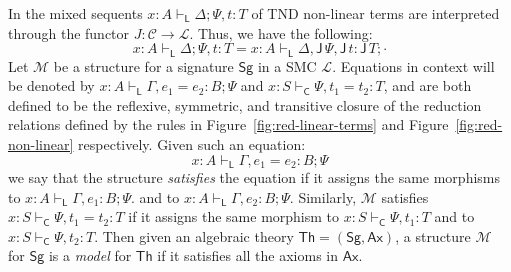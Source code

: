 \documentclass{lmcs}
\newcommand{\DualLNLLogicnt}[1]{\mathit{#1}}
\newcommand{\DualLNLLogicmv}[1]{\mathit{#1}}
\newcommand{\DualLNLLogicsym}[1]{#1}
\begin{document}
In the mixed sequents $x:A \vdash_{\mathsf{L}} \Delta ; \Psi, t:T$ of TND non-linear terms are interpreted through the functor $J :
\mathcal{C} \rightarrow \mathcal{L}$. Thus, we have the following:
\[
   \DualLNLLogicmv{x}  :  \DualLNLLogicnt{A}  \vdash_{\mathsf{L} }  \Delta ; \Psi  \DualLNLLogicsym{,}  \DualLNLLogicnt{t}  \DualLNLLogicsym{:}  \DualLNLLogicnt{T}   =  \DualLNLLogicmv{x}  :  \DualLNLLogicnt{A}  \vdash_{\mathsf{L} }  \Delta  \DualLNLLogicsym{,}    \mathsf{J}\, \Psi    \DualLNLLogicsym{,}   \mathsf{J}\, \DualLNLLogicnt{t}   \DualLNLLogicsym{:}   \mathsf{J}\, \DualLNLLogicnt{T}  ;  \cdot  
\]  
Let $\mathcal{M}$ be a structure for a signature $\mathsf{Sg}$ in a
SMC $\mathcal{L}$. Equations in context will be denoted by $ \DualLNLLogicmv{x}  :  \DualLNLLogicnt{A}  \vdash_{\mathsf{L} }  \Gamma  ,  \DualLNLLogicnt{e_{{\mathrm{1}}}}  =  \DualLNLLogicnt{e_{{\mathrm{2}}}}  :  \DualLNLLogicnt{B}  ;  \Psi $ and $ \DualLNLLogicmv{x}  :  \DualLNLLogicnt{S}  \vdash_{\mathsf{C} }  \Psi ,  \DualLNLLogicnt{t_{{\mathrm{1}}}}  =  \DualLNLLogicnt{t_{{\mathrm{2}}}}  :  \DualLNLLogicnt{T} $, and
are both defined to be the reflexive, symmetric, and transitive
closure of the reduction relations defined by the rules in
Figure~\ref{fig:red-linear-terms} and Figure~\ref{fig:red-non-linear}
respectively.  Given such an equation:
$$
 \DualLNLLogicmv{x}  :  \DualLNLLogicnt{A}  \vdash_{\mathsf{L} }  \Gamma  ,  \DualLNLLogicnt{e_{{\mathrm{1}}}}  =  \DualLNLLogicnt{e_{{\mathrm{2}}}}  :  \DualLNLLogicnt{B}  ;  \Psi 
$$
we say that the structure \emph{satisfies} the equation if it assigns the same morphisms to  
$ \DualLNLLogicmv{x}  :  \DualLNLLogicnt{A}  \vdash_{\mathsf{L} }  \Gamma  \DualLNLLogicsym{,}  \DualLNLLogicnt{e_{{\mathrm{1}}}}  \DualLNLLogicsym{:}  \DualLNLLogicnt{B} ; \Psi $.  and to $ \DualLNLLogicmv{x}  :  \DualLNLLogicnt{A}  \vdash_{\mathsf{L} }  \Gamma  \DualLNLLogicsym{,}  \DualLNLLogicnt{e_{{\mathrm{2}}}}  \DualLNLLogicsym{:}  \DualLNLLogicnt{B} ; \Psi $.
Similarly, $\mathcal{M}$ satisfies $ \DualLNLLogicmv{x}  :  \DualLNLLogicnt{S}  \vdash_{\mathsf{C} }  \Psi ,  \DualLNLLogicnt{t_{{\mathrm{1}}}}  =  \DualLNLLogicnt{t_{{\mathrm{2}}}}  :  \DualLNLLogicnt{T} $ if it assigns the same morphism
to $ \DualLNLLogicmv{x}  :  \DualLNLLogicnt{S}  \vdash_{\mathsf{C} }  \Psi  \DualLNLLogicsym{,}  \DualLNLLogicnt{t_{{\mathrm{1}}}}  \DualLNLLogicsym{:}  \DualLNLLogicnt{T} $ and to $ \DualLNLLogicmv{x}  :  \DualLNLLogicnt{S}  \vdash_{\mathsf{C} }  \Psi  \DualLNLLogicsym{,}  \DualLNLLogicnt{t_{{\mathrm{2}}}}  \DualLNLLogicsym{:}  \DualLNLLogicnt{T} $.
Then given an algebraic theory 
$\mathsf{Th} = (\mathsf{Sg}, \mathsf{Ax})$, a structure $\mathcal{M}$ for $\mathsf{Sg}$ is a {\em model} for $\mathsf{Th}$ if it satisfies all the 
axioms in $\mathsf{Ax}$. 
\end{document}

